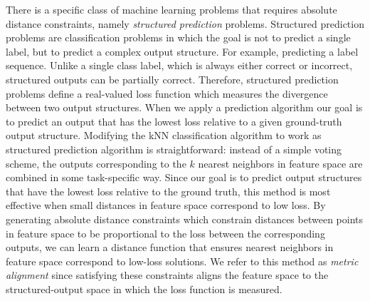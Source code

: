 There is a specific class of machine learning problems that requires absolute distance constraints, namely \emph{structured prediction} problems. Structured prediction problems are classification problems in which the goal is not to predict a single label, but to predict a complex output structure. For example, predicting a label sequence. Unlike a single class label, which is always either correct or incorrect, structured outputs can be partially correct. Therefore, structured prediction problems define a real-valued loss function which measures the divergence between two output structures. When we apply a prediction algorithm our goal is to predict an output that has the lowest loss relative to a given ground-truth output structure. Modifying the \ac{kNN} classification algorithm to work as structured prediction algorithm is straightforward: instead of a simple voting scheme, the outputs corresponding to the $k$ nearest neighbors in feature space are combined in some task-specific way. Since our goal is to predict output structures that have the lowest loss relative to the ground truth, this method is most effective when small distances in feature space correspond to low loss. By generating absolute distance constraints which constrain distances between points in feature space to be proportional to the loss between the corresponding outputs, we can learn a distance function that ensures nearest neighbors in feature space correspond to low-loss solutions. We refer to this method as \emph{metric alignment} since satisfying these constraints aligns the feature space to the structured-output space in which the loss function is measured.

